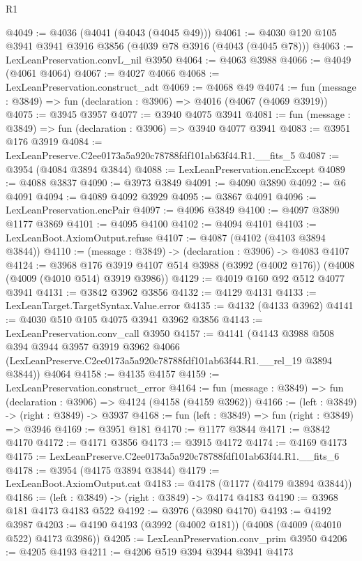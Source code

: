 \begin{lexlean}{R1}
\begin{coremodule}
@4049 := @4036 (@4041 (@4043 (@4045 @49)))
@4061 := @4030 @120 @105 @3941 @3941 @3916 @3856 (@4039 @78 @3916 (@4043 (@4045 @78)))
@4063 := LexLeanPreservation.convL_nil @3950
@4064 := @4063 @3988
@4066 := @4049 (@4061 @4064)
@4067 := @4027 @4066
@4068 := LexLeanPreservation.construct_adt
@4069 := @4068 @49
@4074 := fun (message : @3849) => fun (declaration : @3906) => @4016 (@4067 (@4069 @3919))
@4075 := @3945 @3957
@4077 := @3940 @4075 @3941
@4081 := fun (message : @3849) => fun (declaration : @3906) => @3940 @4077 @3941
@4083 := @3951 @176 @3919
@4084 := LexLeanPreserve.C2ee0173a5a920c78788fdf101ab63f44.R1.__fits_5
@4087 := @3954 (@4084 @3894 @3844)
@4088 := LexLeanPreservation.encExcept
@4089 := @4088 @3837
@4090 := @3973 @3849
@4091 := @4090 @3890
@4092 := @6 @4091
@4094 := @4089 @4092 @3929
@4095 := @3867 @4091
@4096 := LexLeanPreservation.encPair
@4097 := @4096 @3849
@4100 := @4097 @3890 @1177 @3869
@4101 := @4095 @4100
@4102 := @4094 @4101
@4103 := LexLeanBoot.AxiomOutput.refuse
@4107 := @4087 (@4102 (@4103 @3894 @3844))
@4110 := (message : @3849) -> (declaration : @3906) -> @4083 @4107
@4124 := @3968
    @176
    @3919
    @4107
    @514
    @3988
    (@3992 (@4002 @176))
    (@4008 (@4009 (@4010 @514) @3919 @3986))
@4129 := @4019 @160 @92 @512 @4077 @3941
@4131 := @3842 @3962 @3856
@4132 := @4129 @4131
@4133 := LexLeanTarget.TargetSyntax.Value.error
@4135 := @4132 (@4133 @3962)
@4141 := @4030 @510 @105 @4075 @3941 @3962 @3856
@4143 := LexLeanPreservation.conv_call @3950
@4157 := @4141
    (@4143
      @3988
      @508
      @394
      @3944
      @3957
      @3919
      @3962
      @4066
      (LexLeanPreserve.C2ee0173a5a920c78788fdf101ab63f44.R1.__rel_19 @3894 @3844))
    @4064
@4158 := @4135 @4157
@4159 := LexLeanPreservation.construct_error
@4164 := fun (message : @3849) => fun (declaration : @3906) => @4124 (@4158 (@4159 @3962))
@4166 := (left : @3849) -> (right : @3849) -> @3937
@4168 := fun (left : @3849) => fun (right : @3849) => @3946
@4169 := @3951 @181
@4170 := @1177 @3844
@4171 := @3842 @4170
@4172 := @4171 @3856
@4173 := @3915 @4172
@4174 := @4169 @4173
@4175 := LexLeanPreserve.C2ee0173a5a920c78788fdf101ab63f44.R1.__fits_6
@4178 := @3954 (@4175 @3894 @3844)
@4179 := LexLeanBoot.AxiomOutput.cat
@4183 := @4178 (@1177 (@4179 @3894 @3844))
@4186 := (left : @3849) -> (right : @3849) -> @4174 @4183
@4190 := @3968 @181 @4173 @4183 @522
@4192 := @3976 (@3980 @4170)
@4193 := @4192 @3987
@4203 := @4190 @4193 (@3992 (@4002 @181)) (@4008 (@4009 (@4010 @522) @4173 @3986))
@4205 := LexLeanPreservation.conv_prim @3950
@4206 := @4205 @4193
@4211 := @4206 @519 @394 @3944 @3941 @4173

\end{coremodule}
\end{lexlean}
